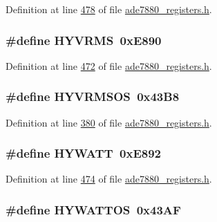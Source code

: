 Definition at line \hyperlink{a00036_source_l00478}{478} of file \hyperlink{a00036_source}{ade7880\-\_\-registers.\-h}.

\hypertarget{a00036_afbd4e3b51312feb540b5675a44d6abf5}{
\subsubsection[{H\-Y\-V\-R\-M\-S}]{\setlength{\rightskip}{0pt plus 5cm}\#define H\-Y\-V\-R\-M\-S~0x\-E890}}\label{de/d8c/a00036_afbd4e3b51312feb540b5675a44d6abf5}


Definition at line \hyperlink{a00036_source_l00472}{472} of file \hyperlink{a00036_source}{ade7880\-\_\-registers.\-h}.

\hypertarget{a00036_a0c59a0da73c75a4cd6ef298a5e866763}{
\subsubsection[{H\-Y\-V\-R\-M\-S\-O\-S}]{\setlength{\rightskip}{0pt plus 5cm}\#define H\-Y\-V\-R\-M\-S\-O\-S~0x43\-B8}}\label{de/d8c/a00036_a0c59a0da73c75a4cd6ef298a5e866763}


Definition at line \hyperlink{a00036_source_l00380}{380} of file \hyperlink{a00036_source}{ade7880\-\_\-registers.\-h}.

\hypertarget{a00036_a34edc40ea8bcbfdb7d03fd94f225d184}{
\subsubsection[{H\-Y\-W\-A\-T\-T}]{\setlength{\rightskip}{0pt plus 5cm}\#define H\-Y\-W\-A\-T\-T~0x\-E892}}\label{de/d8c/a00036_a34edc40ea8bcbfdb7d03fd94f225d184}


Definition at line \hyperlink{a00036_source_l00474}{474} of file \hyperlink{a00036_source}{ade7880\-\_\-registers.\-h}.

\hypertarget{a00036_af780a31635408814bba50784eeb1f462}{
\subsubsection[{H\-Y\-W\-A\-T\-T\-O\-S}]{\setlength{\rightskip}{0pt plus 5cm}\#define H\-Y\-W\-A\-T\-T\-O\-S~0x43\-A\-F}}\label{de/d8c/a00036_af780a31635408814bba50784eeb1f462}


